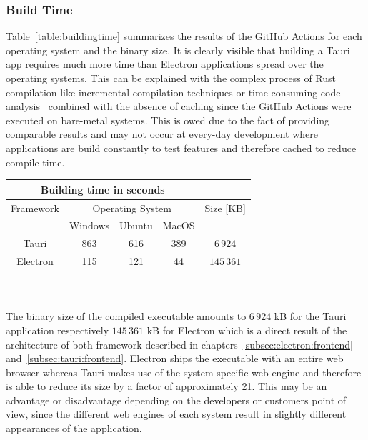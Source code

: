 \subsubsection{Build Time}
\label{subsubsec:perf:buildtime}
Table~\ref{table:buildingtime} summarizes the results of the GitHub Actions for each operating system and the binary size.
It is clearly visible that building a Tauri app requires much more time than Electron applications spread over the operating systems.
This can be explained with the complex process of Rust compilation like incremental compilation techniques or time-consuming code analysis~\cite{rustCompileTime} combined with the absence
of caching since the GitHub Actions were executed on bare-metal systems.
This is owed due to the fact of providing comparable results and may not occur at every-day development where applications are build constantly to test features and therefore cached to reduce compile time.
\\
\begin{tabular} {| c | c | c | c | c |}
    \hline
    \multicolumn{4}{|c|}{Building time in seconds} & \\ \hline
    Framework & \multicolumn{3}{|c|}{Operating System} & Size [KB]  \\ \hline
    & Windows & Ubuntu & MacOS &  \\ \hline
    Tauri & 863 & 616 & 389 & $6\,924$  \\ \hline
    Electron & 115 & 121 & 44 & $145\,361$ \\ \hline
\end{tabular}
\label{table:buildingtime}
\\ \\

The binary size of the compiled executable amounts to $6\,924$ kB for the Tauri application respectively $145\,361$ kB for Electron which is a direct result of the architecture of both framework described in chapters~\ref{subsec:electron:frontend} and~\ref{subsec:tauri:frontend}.
Electron ships the executable with an entire web browser whereas Tauri makes use of the system specific web engine and therefore is able to reduce its size by a factor of approximately 21.
This may be an advantage or disadvantage depending on the developers or customers point of view, since the different web engines of each system result in slightly different appearances of the application.

